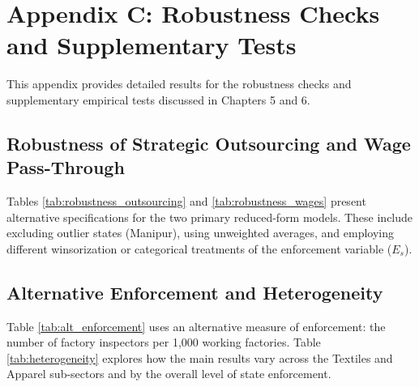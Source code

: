 \chapter{Appendix C: Robustness Checks and Supplementary Tests}
\label{appendixC}

This appendix provides detailed results for the robustness checks and supplementary empirical tests discussed in Chapters 5 and 6.

\section{Robustness of Strategic Outsourcing and Wage Pass-Through}

Tables \ref{tab:robustness_outsourcing} and \ref{tab:robustness_wages} present alternative specifications for the two primary reduced-form models. These include excluding outlier states (Manipur), using unweighted averages, and employing different winsorization or categorical treatments of the enforcement variable ($E_s$).

\begin{table}[H]
	\centering
	\caption{Robustness Checks: Strategic Outsourcing (Log Outsourcing Share)}
	\label{tab:robustness_outsourcing}
	
\end{table}

\begin{table}[H]
	\centering
	\caption{Robustness Checks: Wage Pass-Through (Log Informal Wage)}
	\label{tab:robustness_wages}
	
\end{table}

\newpage
\section{Alternative Enforcement and Heterogeneity}

Table \ref{tab:alt_enforcement} uses an alternative measure of enforcement: the number of factory inspectors per 1,000 working factories. Table \ref{tab:heterogeneity} explores how the main results vary across the Textiles and Apparel sub-sectors and by the overall level of state enforcement.

\begin{table}[H]
	\centering
	\caption{Alternative Enforcement: Inspectors per Factory}
	\label{tab:alt_enforcement}
	
\end{table}

